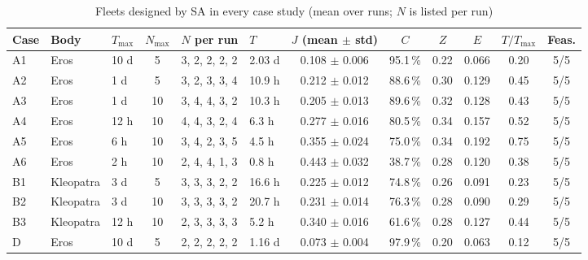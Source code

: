 \begin{table}[htbp]
\centering
\caption{Fleets designed by \ac{SA} in every case study (mean over runs; $N$ is listed per run)}
\label{tab:caseresults}
\scriptsize
\begin{tabular}{@{}lllcllcccccc@{}}
\toprule
Case & Body & $T_{\max}$ & $N_{\max}$ & $N$ per run & $T$ & $J$ (mean $\pm$ std) & $C$ & $Z$ & $E$ & $T/T_{\max}$ & Feas. \\
\midrule
A1 & Eros & 10 d & 5 & 3, 2, 2, 2, 2 & 2.03 d & 0.108 $\pm$ 0.006 & 95.1\,\% & 0.22 & 0.066 & 0.20 & 5/5 \\
A2 & Eros & 1 d & 5 & 3, 2, 3, 3, 4 & 10.9 h & 0.212 $\pm$ 0.012 & 88.6\,\% & 0.30 & 0.129 & 0.45 & 5/5 \\
A3 & Eros & 1 d & 10 & 3, 4, 4, 3, 2 & 10.3 h & 0.205 $\pm$ 0.013 & 89.6\,\% & 0.32 & 0.128 & 0.43 & 5/5 \\
A4 & Eros & 12 h & 10 & 4, 4, 3, 2, 4 & 6.3 h & 0.277 $\pm$ 0.016 & 80.5\,\% & 0.34 & 0.157 & 0.52 & 5/5 \\
A5 & Eros & 6 h & 10 & 3, 4, 2, 3, 5 & 4.5 h & 0.355 $\pm$ 0.024 & 75.0\,\% & 0.34 & 0.192 & 0.75 & 5/5 \\
A6 & Eros & 2 h & 10 & 2, 4, 4, 1, 3 & 0.8 h & 0.443 $\pm$ 0.032 & 38.7\,\% & 0.28 & 0.120 & 0.38 & 5/5 \\
\midrule
B1 & Kleopatra & 3 d & 5 & 3, 3, 3, 2, 2 & 16.6 h & 0.225 $\pm$ 0.012 & 74.8\,\% & 0.26 & 0.091 & 0.23 & 5/5 \\
B2 & Kleopatra & 3 d & 10 & 3, 3, 3, 3, 2 & 20.7 h & 0.231 $\pm$ 0.014 & 76.3\,\% & 0.28 & 0.090 & 0.29 & 5/5 \\
B3 & Kleopatra & 12 h & 10 & 2, 3, 3, 3, 3 & 5.2 h & 0.340 $\pm$ 0.016 & 61.6\,\% & 0.28 & 0.127 & 0.44 & 5/5 \\
\midrule
D & Eros & 10 d & 5 & 2, 2, 2, 2, 2 & 1.16 d & 0.073 $\pm$ 0.004 & 97.9\,\% & 0.20 & 0.063 & 0.12 & 5/5 \\
\bottomrule
\end{tabular}
\end{table}
